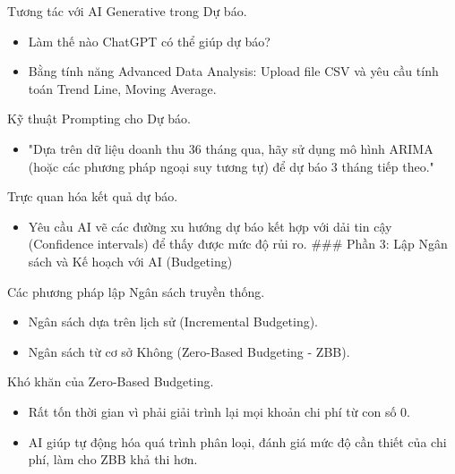 \documentclass[aspectratio=169]{beamer}
\begin{document}
\begin{frame}{Tương tác với AI Generative trong Dự báo.}
    \begin{itemize}
        \item Làm thế nào ChatGPT có thể giúp dự báo?
        \item Bằng tính năng Advanced Data Analysis: Upload file CSV và yêu cầu tính toán Trend Line, Moving Average.
    \end{itemize}
\end{frame}


\begin{frame}{Kỹ thuật Prompting cho Dự báo.}
    \begin{itemize}
        \item "Dựa trên dữ liệu doanh thu 36 tháng qua, hãy sử dụng mô hình ARIMA (hoặc các phương pháp ngoại suy tương tự) để dự báo 3 tháng tiếp theo."
    \end{itemize}
\end{frame}


\begin{frame}{Trực quan hóa kết quả dự báo.}
    \begin{itemize}
        \item Yêu cầu AI vẽ các đường xu hướng dự báo kết hợp với dải tin cậy (Confidence intervals) để thấy được mức độ rủi ro.
        ### Phần 3: Lập Ngân sách và Kế hoạch với AI (Budgeting)
    \end{itemize}
\end{frame}


\begin{frame}{Các phương pháp lập Ngân sách truyền thống.}
    \begin{itemize}
        \item Ngân sách dựa trên lịch sử (Incremental Budgeting).
        \item Ngân sách từ cơ sở Không (Zero-Based Budgeting - ZBB).
    \end{itemize}
\end{frame}


\begin{frame}{Khó khăn của Zero-Based Budgeting.}
    \begin{itemize}
        \item Rất tốn thời gian vì phải giải trình lại mọi khoản chi phí từ con số 0.
        \item AI giúp tự động hóa quá trình phân loại, đánh giá mức độ cần thiết của chi phí, làm cho ZBB khả thi hơn.
    \end{itemize}
\end{frame}
\end{document}
